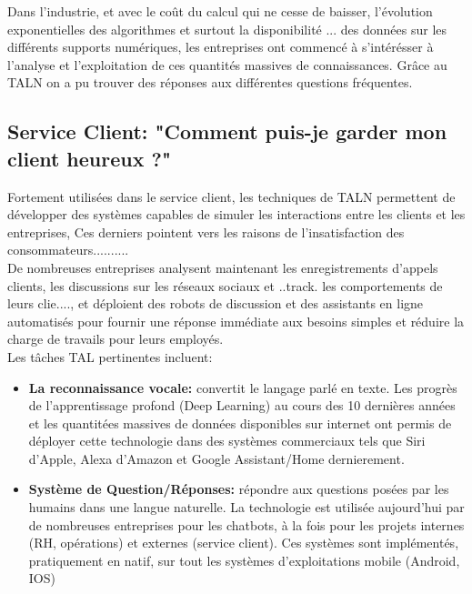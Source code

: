 \documentclass{report}
\begin{document}
Dans l'industrie, et avec le coût du calcul qui ne cesse de baisser, l'évolution exponentielles des algorithmes et surtout la disponibilité ... des données sur les différents supports numériques, les entreprises ont commencé à s'intérésser à l'analyse et l'exploitation de ces quantités massives de connaissances.
Grâce au TALN on a pu trouver des réponses aux différentes questions fréquentes. 

    \subsection*{Service Client: "Comment puis-je garder mon client heureux ?"}
    Fortement utilisées dans le service client, les techniques de TALN permettent de développer des systèmes capables de simuler les interactions entre les clients et les entreprises,
    Ces derniers pointent vers les raisons de l'insatisfaction des consommateurs..........\\
    De nombreuses entreprises analysent maintenant les enregistrements d'appels clients, les discussions sur les réseaux sociaux et ..track. les comportements de leurs clie...., et déploient des robots de discussion et des assistants en ligne automatisés pour fournir une réponse immédiate aux besoins simples et réduire la charge de travails pour leurs employés.\\ 

    Les tâches TAL pertinentes incluent:\\
    \begin{itemize}
        \item \textbf{La reconnaissance vocale:} convertit le langage parlé en texte. Les progrès de l'apprentissage profond (Deep Learning) au cours des 10 dernières années et les quantitées massives de données disponibles sur internet ont permis de déployer cette technologie dans des systèmes commerciaux tels que Siri d'Apple, Alexa d'Amazon et Google Assistant/Home dernierement.\\
        \item \textbf{Système de Question/Réponses:} répondre aux questions posées par les humains dans une langue naturelle. La technologie est utilisée aujourd'hui par de nombreuses entreprises pour les chatbots, à la fois pour les projets internes (RH, opérations) et externes (service client). Ces systèmes sont implémentés, pratiquement en natif, sur tout les systèmes d'exploitations mobile (Android, IOS)  
    \end{itemize}
\end{document}
